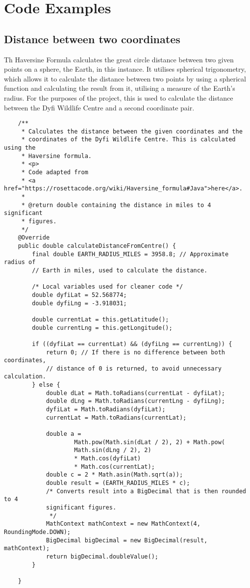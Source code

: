 \chapter{Code Examples}



\section{Distance between two coordinates}

Th Haversine Formula calculates the great circle distance between two given points on a sphere, the Earth, in this instance. It utilises spherical trigonometry, which allows it to calculate the distance between two points by using a spherical function and calculating the result from it, utilising a measure of the Earth's radius. For the purposes of the project, this is used to calculate the distance between the Dyfi Wildlife Centre and a second coordinate pair.

\begin{verbatim}
    /**
     * Calculates the distance between the given coordinates and the
     * coordinates of the Dyfi Wildlife Centre. This is calculated using the
     * Haversine formula.
     * <p>
     * Code adapted from
     * <a href="https://rosettacode.org/wiki/Haversine_formula#Java">here</a>.
     *
     * @return double containing the distance in miles to 4 significant
     * figures.
     */
    @Override
    public double calculateDistanceFromCentre() {
        final double EARTH_RADIUS_MILES = 3958.8; // Approximate radius of
        // Earth in miles, used to calculate the distance.

        /* Local variables used for cleaner code */
        double dyfiLat = 52.568774;
        double dyfiLng = -3.918031;

        double currentLat = this.getLatitude();
        double currentLng = this.getLongitude();

        if ((dyfiLat == currentLat) && (dyfiLng == currentLng)) {
            return 0; // If there is no difference between both coordinates,
            // distance of 0 is returned, to avoid unnecessary calculation.
        } else {
            double dLat = Math.toRadians(currentLat - dyfiLat);
            double dLng = Math.toRadians(currentLng - dyfiLng);
            dyfiLat = Math.toRadians(dyfiLat);
            currentLat = Math.toRadians(currentLat);

            double a =
                    Math.pow(Math.sin(dLat / 2), 2) + Math.pow(
                    Math.sin(dLng / 2), 2)
                    * Math.cos(dyfiLat)
                    * Math.cos(currentLat);
            double c = 2 * Math.asin(Math.sqrt(a));
            double result = (EARTH_RADIUS_MILES * c);
            /* Converts result into a BigDecimal that is then rounded to 4
            significant figures.
             */
            MathContext mathContext = new MathContext(4, RoundingMode.DOWN);
            BigDecimal bigDecimal = new BigDecimal(result, mathContext);
            return bigDecimal.doubleValue();
        }

    }
\end{verbatim}    

